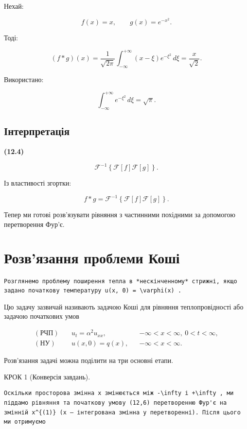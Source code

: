 \documentclass[
  ukrainian,
]{article}
\begin{document}
Нехай:

\[
f(x) = x, \qquad g(x) = e^{-x^2}.
\]

Тоді:

\[
(f*g)(x) = \frac{1}{\sqrt{2\pi}} \int_{-\infty}^{+\infty} (x-\xi)e^{-\xi^2}\,d\xi = \frac{x}{\sqrt{2}}.
\]

Використано:

\[
\int_{-\infty}^{+\infty} e^{-\xi^2}\,d\xi = \sqrt{\pi}.
\]

\subsection{Інтерпретація}\label{ux456ux43dux442ux435ux440ux43fux440ux435ux442ux430ux446ux456ux44f}

\textbf{(12.4)}

\[
\mathcal{F}^{-1}\left\{\mathcal{F}[f]\mathcal{F}[g]\right\}.
\]

Із властивості згортки:

\[
f * g = \mathcal{F}^{-1}\left\{\mathcal{F}[f]\mathcal{F}[g]\right\}.
\]

Тепер ми готові розв'язувати рівняння з частинними похідними за
допомогою перетворення Фур'є.

\section{Розв'язання проблеми
Коші}\label{ux440ux43eux437ux432ux44fux437ux430ux43dux43dux44f-ux43fux440ux43eux431ux43bux435ux43cux438-ux43aux43eux448ux456}

\begin{verbatim}
Розглянемо проблему поширення тепла в *нескінченному* стрижні, якщо задано початкову температуру u(x, 0) = \varphi(x) .
\end{verbatim}

Цю задачу зазвичай називають задачою Коші для рівняння теплопровідності
або задачою початкових умов

\[
\begin{aligned}
(\text{РЧП})\quad & u_t=\alpha^2u_{xx}, && -\infty<x<\infty,\ 0<t<\infty,\\
(\text{НУ})\quad & u(x,0)=q(x), && -\infty<x<\infty.
\end{aligned}
\]

Розв'язання задачі можна поділити на три основні етапи.

КРОК 1 (Конверсія завдань).

\begin{verbatim}
Оскільки просторова змінна x змінюється між -\infty і +\infty , ми піддамо рівняння та початкову умову (12,6) перетворенню Фур'є на змінній x^{(1)} (x — інтегрована змінна у перетворенні). Після цього ми отримуємо
\end{verbatim}
\end{document}
